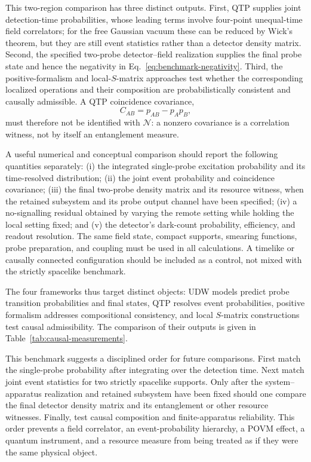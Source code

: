 \documentclass[pdflatex,sn-mathphys-num]{sn-jnl}
\begin{document}
This two-region comparison has three distinct outputs. First, QTP supplies joint detection-time probabilities, whose leading terms involve four-point unequal-time field correlators; for the free Gaussian vacuum these can be reduced by Wick's theorem, but they are still event statistics rather than a detector density matrix. Second, the specified two-probe detector--field realization supplies the final probe state and hence the negativity in Eq.~\eqref{eq:benchmark-negativity}. Third, the positive-formalism and local-$S$-matrix approaches test whether the corresponding localized operations and their composition are probabilistically consistent and causally admissible. A QTP coincidence covariance,
\begin{equation}
C_{AB}=p_{AB}-p_Ap_B,
\label{eq:benchmark-coincidence}
\end{equation}
must therefore not be identified with $\mathcal N$: a nonzero covariance is a correlation witness, not by itself an entanglement measure.

A useful numerical and conceptual comparison should report the following quantities separately: (i) the integrated single-probe excitation probability and its time-resolved distribution; (ii) the joint event probability and coincidence covariance; (iii) the final two-probe density matrix and its resource witness, when the retained subsystem and its probe output channel have been specified; (iv) a no-signalling residual obtained by varying the remote setting while holding the local setting fixed; and (v) the detector's dark-count probability, efficiency, and readout resolution. The same field state, compact supports, smearing functions, probe preparation, and coupling must be used in all calculations. A timelike or causally connected configuration should be included as a control, not mixed with the strictly spacelike benchmark.

The four frameworks thus target distinct objects: UDW models predict probe transition probabilities and final states, QTP resolves event probabilities, positive formalism addresses compositional consistency, and local $S$-matrix constructions test causal admissibility. The comparison of their outputs is given in Table~\ref{tab:causal-measurements}.

This benchmark suggests a disciplined order for future comparisons. First match the single-probe probability after integrating over the detection time. Next match joint event statistics for two strictly spacelike supports. Only after the system--apparatus realization and retained subsystem have been fixed should one compare the final detector density matrix and its entanglement or other resource witnesses. Finally, test causal composition and finite-apparatus reliability. This order prevents a field correlator, an event-probability hierarchy, a POVM effect, a quantum instrument, and a resource measure from being treated as if they were the same physical object.
\end{document}
